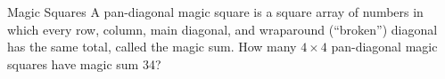 \begin{problem}{Magic Squares}
    A pan-diagonal magic square is a square array of numbers in which every row, column, main diagonal, and wraparound (“broken”) diagonal has the same total, called the magic sum. How many \(4 \times 4\) pan-diagonal magic squares have magic sum 34?

    
\end{problem}

